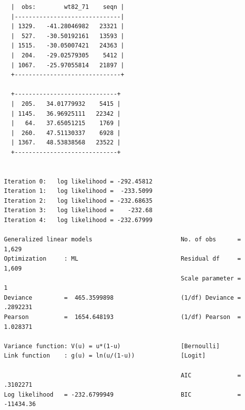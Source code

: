 \documentclass[
  10pt,
]{book}
\begin{document}
\begin{verbatim}
  |  obs:        wt82_71    seqn |
  |------------------------------|
  | 1329.   -41.28046982   23321 |
  |  527.   -30.50192161   13593 |
  | 1515.   -30.05007421   24363 |
  |  204.   -29.02579305    5412 |
  | 1067.   -25.97055814   21897 |
  +------------------------------+

  +-----------------------------+
  |  205.   34.01779932    5415 |
  | 1145.   36.96925111   22342 |
  |   64.   37.65051215    1769 |
  |  260.   47.51130337    6928 |
  | 1367.   48.53838568   23522 |
  +-----------------------------+


Iteration 0:   log likelihood = -292.45812  
Iteration 1:   log likelihood =  -233.5099  
Iteration 2:   log likelihood = -232.68635  
Iteration 3:   log likelihood =    -232.68  
Iteration 4:   log likelihood = -232.67999  

Generalized linear models                         No. of obs      =      1,629
Optimization     : ML                             Residual df     =      1,609
                                                  Scale parameter =          1
Deviance         =  465.3599898                   (1/df) Deviance =   .2892231
Pearson          =  1654.648193                   (1/df) Pearson  =   1.028371

Variance function: V(u) = u*(1-u)                 [Bernoulli]
Link function    : g(u) = ln(u/(1-u))             [Logit]

                                                  AIC             =   .3102271
Log likelihood   = -232.6799949                   BIC             =  -11434.36


\end{verbatim}
\end{document}

